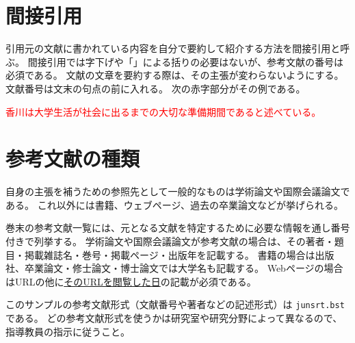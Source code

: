 \section{間接引用}

引用元の文献に書かれている内容を自分で要約して紹介する方法を間接引用と呼ぶ。
間接引用では字下げや「」による括りの必要はないが、参考文献の番号は必須である。
文献の文章を要約する際は、その主張が変わらないようにする。
文献番号は文末の句点の前に入れる。
次の赤字部分がその例である。

\textcolor{red}{
香川は大学生活が社会に出るまでの大切な準備期間であると述べている\cite{学長挨拶23:online}。
}

\begin{comment}
    \begin{textblock}{11}(9, 7.5)
        \noindent
        ↑間接引用では節末・文末の句読点の「前」に文献番号をつける
    \end{textblock}
\end{comment}


\section{参考文献の種類}

自身の主張を補うための参照先として一般的なものは学術論文\cite{neko}や国際会議論文\cite{kajiyama_shapio}である。
これ以外には書籍\cite{kinoshita}、ウェブページ\cite{LIV}、過去の卒業論文\cite{sotsuron}などが挙げられる。

巻末の参考文献一覧には、元となる文献を特定するために必要な情報を通し番号付きで列挙する。
学術論文や国際会議論文が参考文献の場合は、その著者・題目・掲載雑誌名・巻号・掲載ページ・出版年を記載する。
書籍の場合は出版社、卒業論文・修士論文・博士論文では大学名も記載する。
Webページの場合はURLの他に\underline{そのURLを閲覧した日}の記載が必須である。

このサンプルの参考文献形式（文献番号や著者などの記述形式）は \verb|junsrt.bst| である。
どの参考文献形式を使うかは研究室や研究分野によって異なるので、指導教員の指示に従うこと。